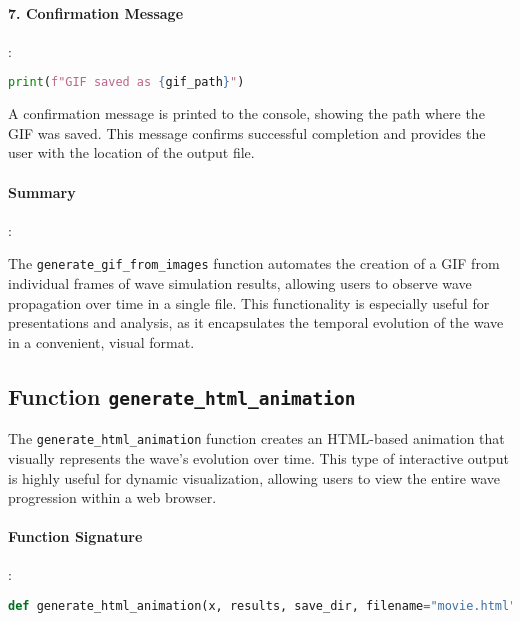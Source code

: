 \documentclass{article}
\begin{document}
			\paragraph{7. Confirmation Message}
			:
			\begin{lstlisting}[language=Python]
				print(f"GIF saved as {gif_path}")
			\end{lstlisting}
			A confirmation message is printed to the console, showing the path where the GIF was saved. This message confirms successful completion and provides the user with the location of the output file.
			
			\paragraph{Summary}
			:
			
			The \texttt{generate\_gif\_from\_images} function automates the creation of a GIF from individual frames of wave simulation results, allowing users to observe wave propagation over time in a single file. This functionality is especially useful for presentations and analysis, as it encapsulates the temporal evolution of the wave in a convenient, visual format.
		
		\subsection{Function \texttt{generate\_html\_animation}}
		
			The \texttt{generate\_html\_animation} function creates an HTML-based animation that visually represents the wave’s evolution over time. This type of interactive output is highly useful for dynamic visualization, allowing users to view the entire wave progression within a web browser.
			
			\paragraph{Function Signature}
			:
			\begin{lstlisting}[language=Python, caption=Function Definition]
				def generate_html_animation(x, results, save_dir, filename="movie.html", ymin=-0.005, ymax=0.005, fps=10):
			\end{lstlisting}
			
\end{document}
